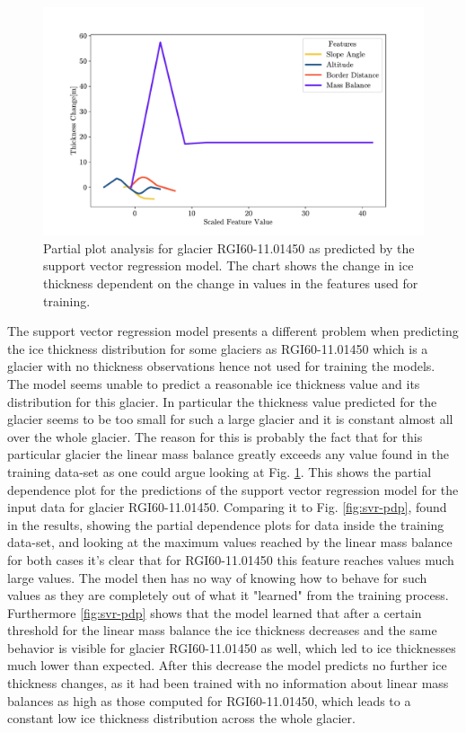 \begin{figure}[!tp]
	\centering		  
	\includegraphics[width=1.\textwidth]{figures/SVR_low_thick_pdp.pdf}
	\caption{Partial plot analysis for glacier RGI60-11.01450 as predicted by the support vector regression model. The chart shows the change in ice thickness dependent on the change in values in the features used for training.}
	\label{fig:svr-pdp-low-thick}
\end{figure}

The support vector regression model presents a different problem when predicting the ice thickness distribution for some glaciers as RGI60-11.01450 which is a glacier with no thickness observations hence not used for training the models. The model seems unable to predict a reasonable ice thickness value and its distribution for this glacier. In particular the thickness value predicted for the glacier seems to be too small for such a large glacier and it is constant almost all over the whole glacier. The reason for this is probably the fact that for this particular glacier the linear mass balance greatly exceeds any value found in the training data-set as one could argue looking at Fig. \ref{fig:svr-pdp-low-thick}. This shows the partial dependence plot for the predictions of the support vector regression model for the input data for glacier RGI60-11.01450. Comparing it to Fig. \ref{fig:svr-pdp}, found in the results, showing the partial dependence plots for data inside the training data-set, and looking at the maximum values reached by  the linear mass balance for both cases it's clear that for RGI60-11.01450 this feature reaches values much large values. The model then has no way of knowing how to behave for such values as they are completely out of what it "learned" from the training process. Furthermore \ref{fig:svr-pdp} shows that the model learned that after a certain threshold for the linear mass balance the ice thickness decreases and the same behavior is visible for glacier RGI60-11.01450 as well, which led to ice thicknesses much lower than expected. After this decrease the model predicts no further ice thickness changes, as it had been trained with no information about linear mass balances as high as those computed for RGI60-11.01450, which leads to a constant low ice thickness distribution across the whole glacier.

